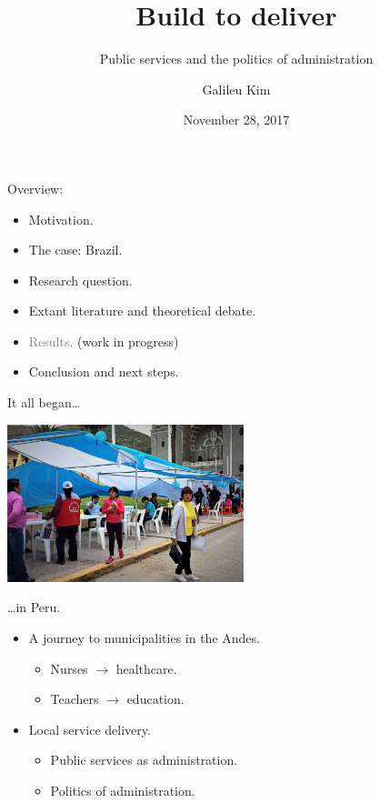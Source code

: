 \documentclass[ignorenonframetext,]{beamer}
\title{Build to deliver}
\subtitle{Public services and the politics of administration}
\author{Galileu Kim}
\institute{Princeton University}
\date{November 28, 2017}
\providecommand{\tightlist}{%
  \setlength{\itemsep}{0pt}\setlength{\parskip}{0pt}}
\begin{document}
\frame{\titlepage}

\begin{frame}{Overview:}

\begin{itemize}[<+->]
\tightlist
\item
  Motivation.
\item
  The case: Brazil.
\item
  Research question.
\item
  Extant literature and theoretical debate.
\item
  \textcolor{gray}{Results.} (work in progress)
\item
  Conclusion and next steps.
\end{itemize}

\end{frame}

\begin{frame}{It all began\ldots{}}

\center

\begin{center}\includegraphics[width=260px]{health_agents} \end{center}

\end{frame}

\begin{frame}{\ldots{}in Peru.}

\begin{itemize}[<+->]
\tightlist
\item
  A journey to municipalities in the Andes.

  \begin{itemize}[<+->]
  \tightlist
  \item
    Nurses \(\rightarrow\) healthcare.
  \item
    Teachers \(\rightarrow\) education.
  \end{itemize}
\item
  Local service delivery.

  \begin{itemize}[<+->]
  \tightlist
  \item
    Public services as administration.
  \item
    Politics of administration.
  \end{itemize}
\end{itemize}

\end{frame}
\end{document}
